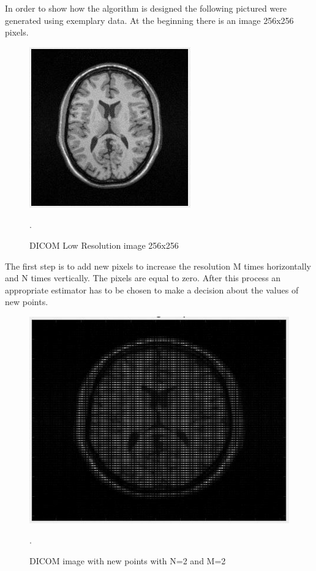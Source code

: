 In order to show how the algorithm is designed the following pictured were generated using exemplary data. At the beginning there is an image 256x256 pixels. 

\begin{figure}[H]
\centering{}\includegraphics[scale=0.7]{figures/Module_10/Module10_2}\caption{DICOM Low Resolution image 256x256}. 
\label{fig: Module9_2}
\end{figure}

The first step is to add new pixels to increase the resolution M times horizontally and N times vertically. The pixels are equal to zero. After this process an appropriate estimator has to be chosen to make a decision about the values of new points.

\begin{figure}[H]
\centering{}\includegraphics[scale=0.5]{figures/Module_10/Module10_3}\caption{DICOM image with new points with N=2 and M=2}. 
\label{fig: Module9_3}
\end{figure}

